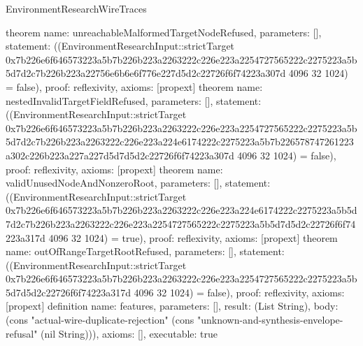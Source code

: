 \begin{lexlean}{EnvironmentResearchWireTraces}
\begin{semanticmodule}
{}
theorem{
 name: unreachableMalformedTargetNodeRefused, parameters: [],
 statement: ((EnvironmentResearchInput::strictTarget 0x7b226e6f646573223a5b7b226b223a2263222c226e223a2254727565222c2275223a5b5d7d2c7b226b223a22756e6b6e6f776e227d5d2c22726f6f74223a307d 4096 32 1024) = false), proof: reflexivity{}, axioms: [propext]
}
theorem{
 name: nestedInvalidTargetFieldRefused, parameters: [],
 statement: ((EnvironmentResearchInput::strictTarget 0x7b226e6f646573223a5b7b226b223a2263222c226e223a2254727565222c2275223a5b5d7d2c7b226b223a2263222c226e223a224e6174222c2275223a5b7b226578747261223a302c226b223a227a227d5d7d5d2c22726f6f74223a307d 4096 32 1024) = false), proof: reflexivity{}, axioms: [propext]
}
theorem{
 name: validUnusedNodeAndNonzeroRoot, parameters: [],
 statement: ((EnvironmentResearchInput::strictTarget 0x7b226e6f646573223a5b7b226b223a2263222c226e223a224e6174222c2275223a5b5d7d2c7b226b223a2263222c226e223a2254727565222c2275223a5b5d7d5d2c22726f6f74223a317d 4096 32 1024) = true), proof: reflexivity{}, axioms: [propext]
}
theorem{
 name: outOfRangeTargetRootRefused, parameters: [],
 statement: ((EnvironmentResearchInput::strictTarget 0x7b226e6f646573223a5b7b226b223a2263222c226e223a2254727565222c2275223a5b5d7d5d2c22726f6f74223a317d 4096 32 1024) = false), proof: reflexivity{}, axioms: [propext]
}
definition{
 name: features, parameters: [], result: (List String),
 body: (cons "actual-wire-duplicate-rejection" (cons "unknown-and-synthesis-envelope-refusal" (nil String))),
 axioms: [], executable: true
}
\end{semanticmodule}
\end{lexlean}
